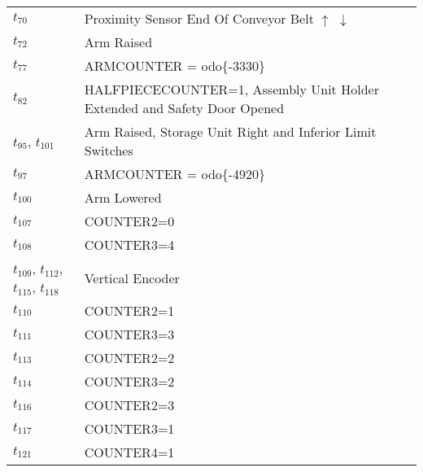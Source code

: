 \begin{longtable}{m{5cm}m{5cm}}
\hyperlink{completeNet:t70}{\hypertarget{completeTable:t70}{$t_{70}$}} & Proximity Sensor End Of Conveyor Belt \(\uparrow\) \(\downarrow\)\\
\hyperlink{completeNet:t72}{\hypertarget{completeTable:t72}{$t_{72}$}} & Arm Raised\\
\hyperlink{completeNet:t77}{\hypertarget{completeTable:t77}{$t_{77}$}} & ARMCOUNTER = 	odo\{-3330\}\\
\hyperlink{completeNet:t82}{\hypertarget{completeTable:t82}{$t_{82}$}} & HALFPIECECOUNTER=1, Assembly Unit Holder Extended and Safety Door Opened\\
\hyperlink{completeNet:t95}{\hypertarget{completeTable:t95}{$t_{95}$}}, \hyperlink{completeNet:t101}{\hypertarget{completeTable:t101}{$t_{101}$}} & Arm Raised, Storage Unit Right and Inferior Limit Switches\\
\hyperlink{completeNet:t97}{\hypertarget{completeTable:t97}{$t_{97}$}} & ARMCOUNTER = 	odo\{-4920\}\\
\hyperlink{completeNet:t100}{\hypertarget{completeTable:t100}{$t_{100}$}} & Arm Lowered\\
\hyperlink{completeNet:t107}{\hypertarget{completeTable:t107}{$t_{107}$}} & COUNTER2=0\\
\hyperlink{completeNet:t108}{\hypertarget{completeTable:t108}{$t_{108}$}} & COUNTER3=4\\
\hyperlink{completeNet:t109}{\hypertarget{completeTable:t109}{$t_{109}$}}, \hyperlink{completeNet:t112}{\hypertarget{completeTable:t112}{$t_{112}$}}, \hyperlink{completeNet:t115}{\hypertarget{completeTable:t115}{$t_{115}$}}, \hyperlink{completeNet:t118}{\hypertarget{completeTable:t118}{$t_{118}$}} & Vertical Encoder\\
\hyperlink{completeNet:t110}{\hypertarget{completeTable:t110}{$t_{110}$}} & COUNTER2=1\\
\hyperlink{completeNet:t111}{\hypertarget{completeTable:t111}{$t_{111}$}} & COUNTER3=3\\
\hyperlink{completeNet:t113}{\hypertarget{completeTable:t113}{$t_{113}$}} & COUNTER2=2\\
\hyperlink{completeNet:t114}{\hypertarget{completeTable:t114}{$t_{114}$}} & COUNTER3=2\\
\hyperlink{completeNet:t116}{\hypertarget{completeTable:t116}{$t_{116}$}} & COUNTER2=3\\
\hyperlink{completeNet:t117}{\hypertarget{completeTable:t117}{$t_{117}$}} & COUNTER3=1\\
\hyperlink{completeNet:t121}{\hypertarget{completeTable:t121}{$t_{121}$}} & COUNTER4=1\\

\end{longtable}
